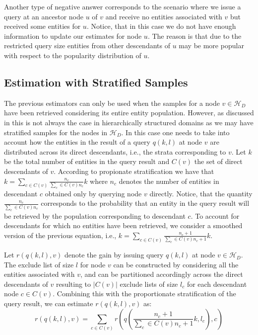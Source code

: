 \documentclass{vldb}
\newcommand{\hierarchy}{\mathcal{H}_D}
\begin{document}
Another type of negative answer corresponds to the scenario where we issue a query at an ancestor node $u$ of $v$ and receive no entities associated with $v$ but received some entities for $u$. Notice, that in this case we do not have enough information to update our estimates for node $u$. The reason is that due to the restricted query size entities from other descendants of $u$ may be more popular with respect to the popularity distribution of $u$.

\subsection{Estimation with Stratified Samples}
The previous estimators can only be used when the samples for a node $v \in \hierarchy$ have been retrieved considering its entire entity population. However, as discussed in  this is not always the case in hierarchically structured domains as we may have stratified samples for the nodes in $\hierarchy$. In this case one needs to take into account how the entities in the result of a query $q(k,l)$ at node $v$ are distributed across its direct descendants, i.e., the strata corresponding to $v$. Let $k$ be the total number of entities in the query result and $C(v)$ the set of direct descendants of $v$. According to propionate stratification we have that $k = \sum_{c \in C(v)} \frac{n_c}{\sum_c \in C(v) n_c} k$ where $n_c$ denotes the number of entities in descendant $c$ obtained only by querying node $v$ directly. Notice, that the quantity $\frac{n_c}{\sum_c \in C(v) n_c}$ corresponds to the probability that an entity in the query result will be retrieved by the population corresponding to descendant $c$.  To account for descendants for which no entities have been retrieved, we consider a smoothed version of the previous equation, i.e., $k = \sum_{c \in C(v)} \frac{n_c + 1}{\sum_c \in C(v) n_c+ 1} k$. 

Let $r(q(k,l),v)$ denote the gain by issuing query $q(k,l)$ at node $v \in \hierarchy$. The exclude list of size $l$ for node $v$ can be constructed by considering all the entities associated with $v$, and can be partitioned accordingly across the direct descendants of $v$ resulting to $|C(v)|$ exclude lists of size $l_c$ for each descendant node $c \in C(v)$.  Combining this with the proportionate stratification of the query result, we can estimate $r(q(k,l),v)$ as:
\begin{equation}
r(q(k,l),v) = \sum_{c \in C(v)} r(q(\frac{n_c + 1}{\sum_c \in C(v) n_c+ 1} k,l_c),c)
\end{equation}
\end{document}
